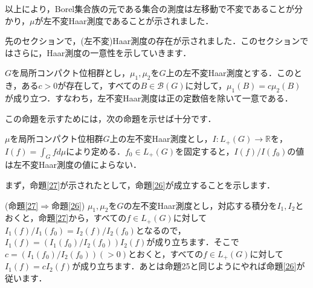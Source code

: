 \begin{Proof}
以上により，Borel集合族の元である集合の測度は左移動で不変であることが分かり，$\mu$が左不変Haar測度であることが示されました．　
\end{Proof}
先のセクションで，(左不変)Haar測度の存在が示されました．このセクションではさらに，Haar測度の一意性を示していきます．

\begin{yprop}\label{26}
$G$を局所コンパクト位相群とし，$\mu_1, \mu_2$を$G$上の左不変Haar測度とする．このとき，ある$c>0$が存在して，すべての$B \in \mathscr{B}(G)$に対して，$\mu_1(B)=c\mu_2(B)$が成り立つ．すなわち，左不変Haar測度は正の定数倍を除いて一意である．
\end{yprop}
この命題を示すためには，次の命題を示せば十分です．
\begin{yprop}\label{27}
$\mu$を局所コンパクト位相群$G$上の左不変Haar測度とし，$I \colon L_{+}(G) \to \mathbb{R}$を，$I(f)=\int_{G}f d\mu$により定める．$f_0 \in L_{+}(G)$を固定すると，$I(f)/I(f_0)$の値は左不変Haar測度の値によらない．
\end{yprop}
まず，命題\ref{27}が示されたとして，命題\ref{26}が成立することを示します．
\begin{Proof}(命題\ref{27}$\Rightarrow$命題\ref{26}) $\mu_1, \mu_2$を$G$の左不変Haar測度とし，対応する積分を$I_1, I_2$とおくと，命題\ref{27}から，すべての$f \in L_{+}(G)$に対して$I_{1}(f)/I_{1}(f_0)=I_{2}(f)/I_{2}(f_0)$となるので，$I_{1}(f)= \left( I_{1}(f_0)/I_{2}(f_{0}) \right) I_{2}(f)$が成り立ちます．そこで$c=\left( I_{1}(f_0)/I_{2}(f_{0}) \right)(>0)$とおくと，すべての$f \in L_{+}(G)$に対して$I_{1}(f)= c I_{2}(f)$が成り立ちます．あとは命題25と同じようにやれば命題\ref{26}が従います．
\end{Proof}

